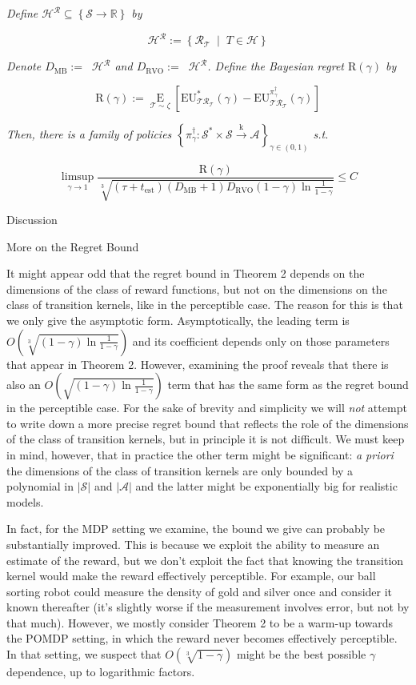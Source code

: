 \documentclass[a4paper]{article}
\newcommand{\Co}[1]{}
\newcommand{\AP}[1]{\left(#1\right)}
\newcommand{\AB}[1]{\left[#1\right]}
\newcommand{\AC}[1]{\left\{#1\right\}}
\newcommand{\ACM}[2]{\left\{#1\;\middle\vert\;#2\right\}}
\newcommand{\Abs}[1]{\left\vert #1 \right\vert}
\newcommand{\Ea}[2]{\underset{#1}{\operatorname{E}}\AB{#2}}
\newcommand{\Reals}{\mathbb{R}}
\newcommand{\K}{\xrightarrow{\mathrm{k}}}
\newcommand{\St}{\mathcal{S}}
\newcommand{\A}{\mathcal{A}}
\newcommand{\R}{\mathcal{R}}
\newcommand{\T}{\mathcal{T}}
\newcommand{\Hy}{\mathcal{H}}
\DeclareMathOperator{\RVO}{\dim_{RVO}}
\DeclareMathOperator{\MB}{\dim_{MB}}
\newcommand{\DRVO}{D_{\mathrm{RVO}}}
\newcommand{\DMB}{D_{\mathrm{MB}}}
\newcommand{\EU}{\mathrm{EU}}
\newcommand{\Reg}{\mathrm{R}}
\begin{document}
\textit{Define $\Hy^\R\subseteq\AC{\St\rightarrow\Reals}$ by}\Co{i}

$$\Hy^\R:=\ACM{\R_\T}{T\in\Hy}$$

\textit{Denote $\DMB:=\MB{\Hy^\R}$ and $\DRVO:=\RVO{\Hy^\R}$. Define the Bayesian regret $\Reg(\gamma)$ by}

$$\Reg(\gamma):=\Ea{\T\sim\zeta}{\EU^*_{\T\R_\T}(\gamma)-\EU^{\pi^\dagger_\gamma}_{\T\R_\T}(\gamma)}$$

\textit{Then, there is a family of policies $\AC{\pi^\dagger_\gamma:\St^*\times\St\K\A}_{\gamma\in(0,1)}$ s.t.}\Co{i}

$$\limsup_{\gamma \rightarrow 1}\frac{\Reg(\gamma)}{\sqrt[3]{\AP{\tau+t_{\mathrm{est}}}\AP{\DMB+1}\DRVO(1-\gamma)\ln{\frac{1}{1-\gamma}}}}\leq C$$

\begin{Huge}Discussion\end{Huge}

\begin{Large}More on the Regret Bound\end{Large}

It might appear odd that the regret bound in Theorem 2 depends on the dimensions of the class of reward functions, but not on the dimensions on the class of transition kernels, like in the perceptible case. The reason for this is that we only give the asymptotic form. Asymptotically, the leading term is $O\AP{\sqrt[3]{\AP{1-\gamma}\ln{\frac{1}{1-\gamma}}}}$ and its coefficient depends only on those parameters that appear in Theorem 2. However, examining the proof reveals that there is also an $O\AP{\sqrt{\AP{1-\gamma}\ln{\frac{1}{1-\gamma}}}}$ term that has the same form as the regret bound in the perceptible case. For the sake of brevity and simplicity we will \textit{not}\Co{i} attempt to write down a more precise regret bound that reflects the role of the dimensions of the class of transition kernels, but in principle it is not difficult. We must keep in mind, however, that in practice the other term might be significant: \textit{a priori}\Co{i} the dimensions of the class of transition kernels are only bounded by a polynomial in $\Abs{\St}$ and $\Abs{\A}$ and the latter might be exponentially big for realistic models. 

In fact, for the MDP setting we examine, the bound we give can probably be substantially improved. This is because we exploit the ability to measure an estimate of the reward, but we don't exploit the fact that knowing the transition kernel would make the reward effectively perceptible. For example, our ball sorting robot could measure the density of gold and silver once and consider it known thereafter (it's slightly worse if the measurement involves error, but not by that much). However, we mostly consider Theorem 2 to be a warm-up towards the POMDP setting, in which the reward never becomes effectively perceptible. In that setting, we suspect that $O\AP{\sqrt[3]{1-\gamma}}$ might be the best possible $\gamma$ dependence, up to logarithmic factors.
\end{document}

